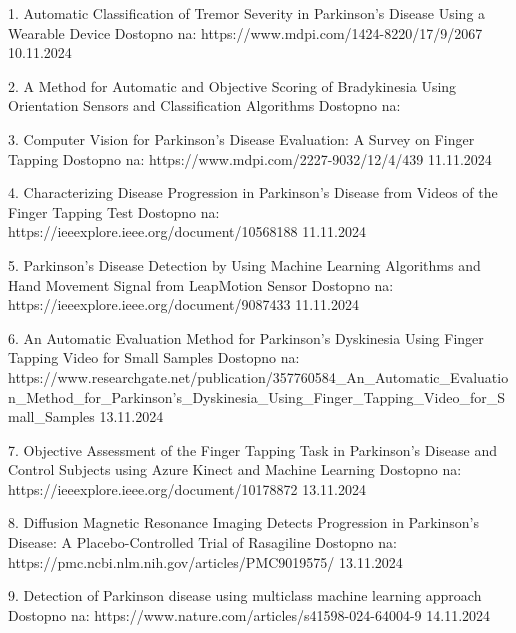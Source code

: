 1. Automatic Classification of Tremor Severity in Parkinson’s Disease Using a Wearable Device
Dostopno na: https://www.mdpi.com/1424-8220/17/9/2067
10.11.2024

2. A Method for Automatic and Objective Scoring of Bradykinesia Using Orientation Sensors and Classification Algorithms
Dostopno na: 

3. Computer Vision for Parkinson’s Disease Evaluation: A Survey on Finger Tapping
Dostopno na: https://www.mdpi.com/2227-9032/12/4/439
11.11.2024

4. Characterizing Disease Progression in Parkinson’s Disease from Videos of the Finger Tapping Test
Dostopno na: https://ieeexplore.ieee.org/document/10568188
11.11.2024

5. Parkinson’s Disease Detection by Using Machine Learning Algorithms and Hand Movement Signal from LeapMotion Sensor
Dostopno na: https://ieeexplore.ieee.org/document/9087433
11.11.2024

6. An Automatic Evaluation Method for Parkinson's Dyskinesia Using Finger Tapping Video for Small Samples
Dostopno na: https://www.researchgate.net/publication/357760584_An_Automatic_Evaluation_Method_for_Parkinson's_Dyskinesia_Using_Finger_Tapping_Video_for_Small_Samples 
13.11.2024

7. Objective Assessment of the Finger Tapping Task in Parkinson’s Disease and Control Subjects using Azure Kinect and Machine Learning
Dostopno na: https://ieeexplore.ieee.org/document/10178872
13.11.2024

8. Diffusion Magnetic Resonance Imaging Detects Progression in Parkinson’s Disease: A Placebo-Controlled Trial of Rasagiline
Dostopno na: https://pmc.ncbi.nlm.nih.gov/articles/PMC9019575/
13.11.2024

9. Detection of Parkinson disease using multiclass machine learning approach
Dostopno na: https://www.nature.com/articles/s41598-024-64004-9
14.11.2024


